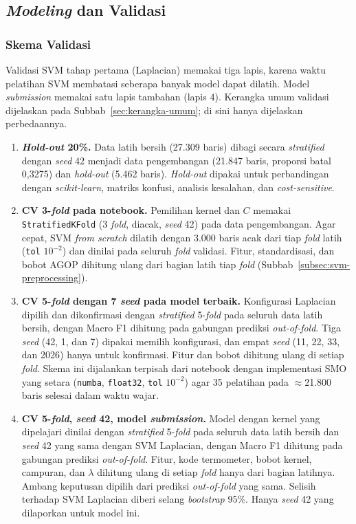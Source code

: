 \subsection{\textit{Modeling} dan Validasi}
\label{subsec:svm-validasi}

\subsubsection{Skema Validasi}
Validasi SVM tahap pertama (Laplacian) memakai tiga lapis, karena waktu pelatihan SVM membatasi seberapa banyak model dapat dilatih. Model \textit{submission} memakai satu lapis tambahan (lapis 4). Kerangka umum validasi dijelaskan pada Subbab~\ref{sec:kerangka-umum}; di sini hanya dijelaskan perbedaannya.
\begin{enumerate}
	\item \textbf{\textit{Hold-out} 20\%.} Data latih bersih (27.309 baris) dibagi secara \textit{stratified} dengan \textit{seed} 42 menjadi data pengembangan (21.847 baris, proporsi batal 0,3275) dan \textit{hold-out} (5.462 baris). \textit{Hold-out} dipakai untuk perbandingan dengan \textit{scikit-learn}, matriks konfusi, analisis kesalahan, dan \textit{cost-sensitive}.
	\item \textbf{CV 3-\textit{fold} pada notebook.} Pemilihan kernel dan $C$ memakai \texttt{StratifiedKFold} (3 \textit{fold}, diacak, \textit{seed} 42) pada data pengembangan. Agar cepat, SVM \textit{from scratch} dilatih dengan 3.000 baris acak dari tiap \textit{fold} latih (\texttt{tol} $10^{-2}$) dan dinilai pada seluruh \textit{fold} validasi. Fitur, standardisasi, dan bobot AGOP dihitung ulang dari bagian latih tiap \textit{fold} (Subbab~\ref{subsec:svm-preprocessing}).
	\item \textbf{CV 5-\textit{fold} dengan 7 \textit{seed} pada model terbaik.} Konfigurasi Laplacian dipilih dan dikonfirmasi dengan \textit{stratified} 5-\textit{fold} pada seluruh data latih bersih, dengan Macro F1 dihitung pada gabungan prediksi \textit{out-of-fold}. Tiga \textit{seed} (42, 1, dan 7) dipakai memilih konfigurasi, dan empat \textit{seed} (11, 22, 33, dan 2026) hanya untuk konfirmasi. Fitur dan bobot dihitung ulang di setiap \textit{fold}. Skema ini dijalankan terpisah dari notebook dengan implementasi SMO yang setara (\texttt{numba}, \texttt{float32}, \texttt{tol} $10^{-2}$) agar 35 pelatihan pada $\approx$21.800 baris selesai dalam waktu wajar.
	\item \textbf{CV 5-\textit{fold}, \textit{seed} 42, model \textit{submission}.} Model dengan kernel yang dipelajari dinilai dengan \textit{stratified} 5-\textit{fold} pada seluruh data latih bersih dan \textit{seed} 42 yang sama dengan SVM Laplacian, dengan Macro F1 dihitung pada gabungan prediksi \textit{out-of-fold}. Fitur, kode termometer, bobot kernel, campuran, dan $\lambda$ dihitung ulang di setiap \textit{fold} hanya dari bagian latihnya. Ambang keputusan dipilih dari prediksi \textit{out-of-fold} yang sama. Selisih terhadap SVM Laplacian diberi selang \textit{bootstrap} 95\%. Hanya \textit{seed} 42 yang dilaporkan untuk model ini.
\end{enumerate}

